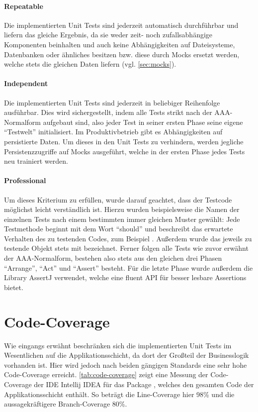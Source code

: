 \paragraph{Repeatable} Die implementierten Unit Tests sind jederzeit automatisch durchführbar und liefern das gleiche Ergebnis, da sie weder zeit- noch zufallsabhängige Komponenten beinhalten und auch keine Abhängigkeiten auf Dateisysteme, Datenbanken oder ähnliches besitzen bzw. diese durch Mocks ersetzt werden, welche stets die gleichen Daten liefern (vgl. \autoref{sec:mocks}).

\paragraph{Independent} Die implementierten Unit Tests sind jederzeit in beliebiger Reihenfolge ausführbar. Dies wird sichergestellt, indem alle Tests strikt nach der AAA-Normalform aufgebaut sind, also jeder Test in seiner ersten Phase seine eigene \enquote{Testwelt} initialisiert. Im Produktivbetrieb gibt es Abhängigkeiten auf persistierte Daten. Um dieses in den Unit Tests zu verhindern, werden jegliche Persistenzzugriffe auf Mocks ausgeführt, welche in der ersten Phase jedes Tests neu trainiert werden.

\paragraph{Professional} Um dieses Kriterium zu erfüllen, wurde darauf geachtet, dass der Testcode möglichst leicht verständlich ist. Hierzu wurden beispielsweise die Namen der einzelnen Tests nach einem bestimmten immer gleichen Muster gewählt: Jede Testmethode beginnt mit dem Wort \enquote{should} und beschreibt das erwartete Verhalten des zu testenden Codes, zum Beispiel . Außerdem wurde das jeweils zu testende Objekt stets mit  bezeichnet. Ferner folgen alle Tests wie zuvor erwähnt der AAA-Normalform, bestehen also stets aus den gleichen drei Phasen \enquote{Arrange}, \enquote{Act} und \enquote{Assert} besteht. Für die letzte Phase wurde außerdem die Library AssertJ verwendet, welche eine fluent \ac{API} für besser lesbare Assertions bietet.

\section{Code-Coverage}
\label{sec:code-coverage}
Wie eingangs erwähnt beschränken sich die implementierten Unit Tests im Wesentlichen auf die Applikationsschicht, da dort der Großteil der Businesslogik vorhanden ist. Hier wird jedoch nach beiden gängigen Standards eine sehr hohe Code-Coverage erreicht. \autoref{tab:code-coverage} zeigt eine Messung der Code-Coverage der \acs{IDE} Intellij IDEA für das Package , welches den gesamten Code der Applikationsschicht enthält. So beträgt die Line-Coverage hier 98\% und die aussagekräftigere Branch-Coverage 80\%. 

